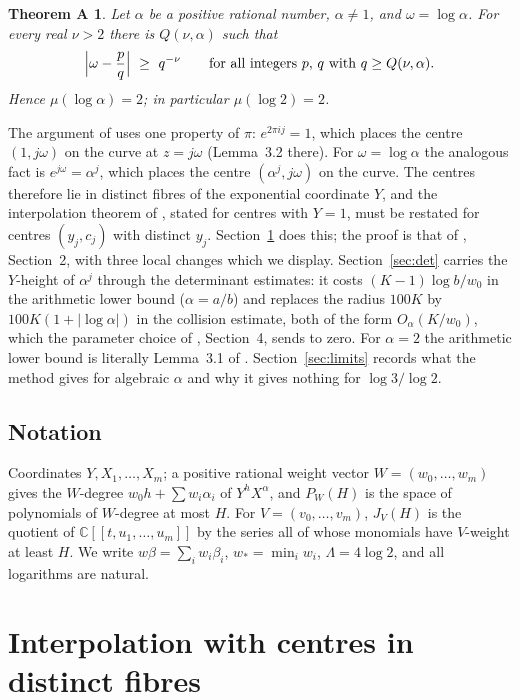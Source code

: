 \documentclass[11pt]{amsart}
\newtheorem*{theoremA}{Theorem A}
\newcommand{\C}{\mathbb{C}}
\begin{document}
\begin{theoremA}
Let $\alpha$ be a positive rational number, $\alpha\ne1$, and $\omega=\log\alpha$. For every real $\nu>2$ there is $Q(\nu,\alpha)$ such that
\[
\Bigl|\omega-\frac pq\Bigr|\ \ge\ q^{-\nu}\qquad\text{for all integers $p$, $q$ with $q\ge Q(\nu,\alpha)$.}
\]
Hence $\mu(\log\alpha)=2$; in particular $\mu(\log2)=2$.
\end{theoremA}

The argument of \cite{OAI} uses one property of $\pi$: $e^{2\pi ij}=1$, which places the centre $(1,j\omega)$ on the curve at $z=j\omega$ (Lemma~3.2 there). For $\omega=\log\alpha$ the analogous fact is $e^{j\omega}=\alpha^j$, which places the centre $(\alpha^j,j\omega)$ on the curve. The centres therefore lie in distinct fibres of the exponential coordinate $Y$, and the interpolation theorem of \cite{OAI}, stated for centres with $Y=1$, must be restated for centres $(y_j,c_j)$ with distinct $y_j$. Section~\ref{sec:interp} does this; the proof is that of \cite{OAI}, Section~2, with three local changes which we display. Section~\ref{sec:det} carries the $Y$-height of $\alpha^j$ through the determinant estimates: it costs $(K-1)\log b/w_0$ in the arithmetic lower bound ($\alpha=a/b$) and replaces the radius $100K$ by $100K(1+|\log\alpha|)$ in the collision estimate, both of the form $O_\alpha(K/w_0)$, which the parameter choice of \cite{OAI}, Section~4, sends to zero. For $\alpha=2$ the arithmetic lower bound is literally Lemma~3.1 of \cite{OAI}. Section~\ref{sec:limits} records what the method gives for algebraic $\alpha$ and why it gives nothing for $\log3/\log2$.

\subsection*{Notation}
Coordinates $Y,X_1,\dots,X_m$; a positive rational weight vector $W=(w_0,\dots,w_m)$ gives the $W$-degree $w_0h+\sum w_i\alpha_i$ of $Y^hX^\alpha$, and $P_W(H)$ is the space of polynomials of $W$-degree at most $H$. For $V=(v_0,\dots,v_m)$, $J_V(H)$ is the quotient of $\C[[t,u_1,\dots,u_m]]$ by the series all of whose monomials have $V$-weight at least $H$. We write $w\beta=\sum_iw_i\beta_i$, $w_*=\min_iw_i$, $\Lambda=4\log2$, and all logarithms are natural.

\section{Interpolation with centres in distinct fibres}\label{sec:interp}
\end{document}

